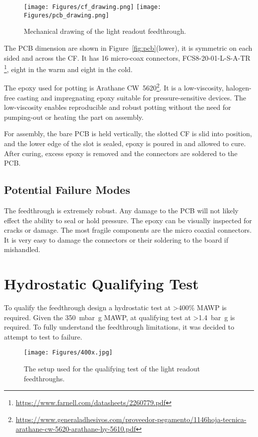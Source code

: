 \documentclass[a4paper]{article}
\begin{document}
\begin{figure}[htbp]
	\centering
	\texttt{[image: Figures/cf\_drawing.png]}
	\texttt{[image: Figures/pcb\_drawing.png]}
	\caption{Mechanical drawing of the light readout feedthrough.}
	\label{fig:cf}
\end{figure}

The PCB dimension are shown in Figure~\ref{fig:pcb}(lower), it is symmetric on each sided and across the CF. 
It has 16 micro-coax connectors, FCS8-20-01-L-S-A-TR \footnote{\url{https://www.farnell.com/datasheets/2260779.pdf}}, eight in the warm and eight in the cold.   

The epoxy used for potting is Arathane\textsuperscript{\textregistered} CW~5620\footnote{\url{https://www.generaladhesivos.com/proveedor-pegamento/1146hoja-tecnica-arathane-cw-5620-arathane-hy-5610.pdf}}.
It is a low-viscosity, halogen-free casting and impregnating epoxy suitable for pressure-sensitive devices.
The low-viscosity enables reproducible and robust potting without the need for pumping-out or heating the part on assembly.

For assembly, the bare PCB is held vertically, the slotted CF is slid into position, and the lower edge of the slot is sealed, epoxy is poured in and allowed to cure. After curing, excess epoxy is removed and the connectors are soldered to the PCB.
    
\subsection{Potential Failure Modes}
The feedthrough is extremely robust.  
Any damage to the PCB will not likely effect the ability to seal or hold pressure.
The epoxy can be visually inspected for cracks or damage. 
The most fragile components are the micro coaxial connectors.
It is very easy to damage the connectors or their soldering to the board if mishandled.  

\section{Hydrostatic Qualifying Test}
To qualify the feedthrough design a hydrostatic test at >400\% MAWP is required. 
Given the \SI{350}{\milli\bar\g} MAWP, at qualifying test at >\SI{1.4}{\bar\g} is required. 
To fully understand the feedthrough limitations, it was decided to attempt to test to failure.

\begin{figure}[htbp]
	\centering
	\texttt{[image: Figures/400x.jpg]}
	\caption{The setup used for the qualifying test of the light readout feedthroughs.}
	\label{fig:setup}
\end{figure}
\end{document}
